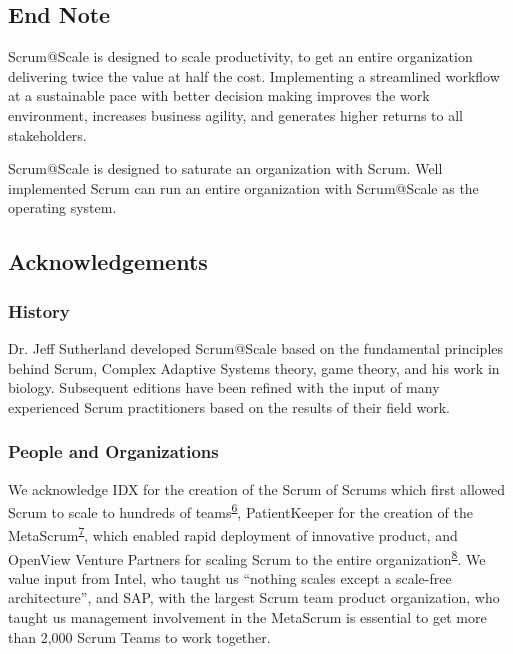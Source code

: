 \documentclass[12pt,a4paper,parskip=full]{scrartcl}
\begin{document}
\subsection{End Note}\label{End-Note}

Scrum@Scale is designed to scale productivity, to get an entire
organization delivering twice the value at half the cost. Implementing a
streamlined workflow at a sustainable pace with better decision making
improves the work environment, increases business agility, and generates
higher returns to all stakeholders.

Scrum@Scale is designed to saturate an organization with Scrum. Well
implemented Scrum can run an entire organization with Scrum@Scale as the
operating system.

\subsection{Acknowledgements}\label{Acknowledgements}

\subsubsection{History}\label{History}

Dr. Jeff Sutherland developed Scrum@Scale based on the fundamental principles behind Scrum, Complex Adaptive Systems theory, game theory, and his work in biology. Subsequent editions have been refined with the input of many experienced Scrum practitioners based on the results of their field work.

\subsubsection{People and Organizations}\label{People-and-Organizations}

We acknowledge IDX for the creation of the Scrum of Scrums which first
allowed Scrum to scale to hundreds of
teams\textsuperscript{\hyperref[citation6]{6}}, PatientKeeper for the
creation of the MetaScrum\textsuperscript{\hyperref[citation7]{7}},
which enabled rapid deployment of innovative product, and OpenView
Venture Partners for scaling Scrum to the entire
organization\textsuperscript{\hyperref[citation8]{8}}. We value input
from Intel, who taught us ``nothing scales except a scale-free
architecture'', and SAP, with the largest Scrum team product
organization, who taught us management involvement in the MetaScrum is
essential to get more than 2,000 Scrum Teams to work together.
\end{document}
